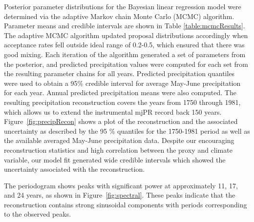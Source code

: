 
Posterior parameter distributions for the Bayesian linear regression model were determined via the adaptive Markov chain Monte Carlo (MCMC) algorithm. Parameter means and credible intervals are shown in Table \ref{table:mcmcResults}. The adaptive MCMC algorithm updated proposal distributions accordingly when acceptance rates fell outside ideal range of 0.2-0.5, which ensured that there was good mixing. Each iteration of the algorithm generated a set of parameters from the posterior, and predicted precipitation values were computed for each set from the resulting parameter chains for all years. Predicted precipitation quantiles were used to obtain a 95\% credible interval for average May-June precipitation for each year. Annual predicted precipitation means were also computed. The resulting precipitation reconstruction covers the years from 1750 through 1981, which allows us to extend the instrumental mjPR record back 150 years. Figure~\ref{fig:precipRecon} shows a plot of the reconstruction and the associated uncertainty as described by the 95 \% quantiles for the 1750-1981 period as well as the available averaged May-June precipitation data. Despite our encouraging reconstruction statistics and high correlation between the proxy and climate variable, our model fit generated wide credible intervals which showed the uncertainty associated with the reconstruction. 

The periodogram shows peaks with significant power at approximately 11, 17, and 24 years, as shown in Figure~\ref{fig:spectral}. These peaks indicate that the reconstruction contains strong sinusoidal components with periods corresponding to the observed peaks. 

